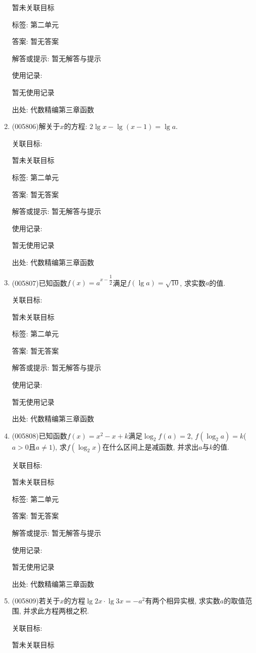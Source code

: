 \documentclass[10pt,a4paper]{article}
\begin{document}
\begin{enumerate}[1.]
暂未关联目标



标签: 第二单元

答案: 暂无答案

解答或提示: 暂无解答与提示

使用记录:

暂无使用记录


出处: 代数精编第三章函数
\item { (005806)}解关于$x$的方程: $2\lg x-\lg (x-1)=\lg a$.


关联目标:

暂未关联目标



标签: 第二单元

答案: 暂无答案

解答或提示: 暂无解答与提示

使用记录:

暂无使用记录


出处: 代数精编第三章函数
\item { (005807)}已知函数$f(x)=a^{x-\dfrac 12}$满足$f(\lg a)=\sqrt {10}$, 求实数$a$的值.


关联目标:

暂未关联目标



标签: 第二单元

答案: 暂无答案

解答或提示: 暂无解答与提示

使用记录:

暂无使用记录


出处: 代数精编第三章函数
\item { (005808)}已知函数$f(x)=x^2-x+k$满足$\log_2f(a)=2$, $f(\log_2a)=k$($a>0$且$a\ne 1$), 求$f(\log_2x)$在什么区间上是减函数, 并求出$a$与$k$的值.


关联目标:

暂未关联目标



标签: 第二单元

答案: 暂无答案

解答或提示: 暂无解答与提示

使用记录:

暂无使用记录


出处: 代数精编第三章函数
\item { (005809)}若关于$x$的方程$\lg 2x\cdot \lg 3x=-a^2$有两个相异实根, 求实数$a$的取值范围, 并求此方程两根之积.


关联目标:

暂未关联目标




\end{enumerate}
\end{document}
